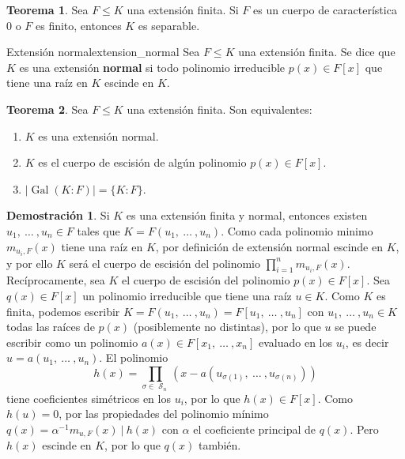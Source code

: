 \documentclass[a4paper]{book}
\theoremstyle{definition}
\newtheorem{theorem}{Teorema}[section]
\theoremstyle{ejemplo}
\theoremstyle{demostracion}
\newtheorem{dem}{Demostración}
\DeclareMathOperator{\simgroup}{\mathcal{S}}
\DeclareMathOperator{\grupogalois}{Gal}
\begin{document}
\begin{theorem}
	Sea $F \leq K$ una extensión finita. Si $F$ es un cuerpo de característica $0$ o $F$ es finito, entonces $K$ es separable.
\end{theorem}

\begin{define}{Extensión normal}{extension_normal}
	Sea $F \leq K$ una extensión finita. Se dice que $K$ es una extensión \textbf{normal} si todo polinomio irreducible $p(x) \in F[x]$ que tiene una raíz en $K$ escinde en $K$.
\end{define}

\begin{theorem}
	Sea $F \leq K$ una extensión finita. Son equivalentes:
	\begin{enumerate}
		\item
		$K$ es una extensión normal.
		\item
		$K$ es el cuerpo de escisión de algún polinomio $p(x) \in F[x]$.
		\item
		$|\grupogalois(K:F)| = \{K:F\}$.
	\end{enumerate}
\end{theorem}

\begin{dem}
	Si $K$ es una extensión finita y normal, entonces existen $u_1,\ \ldots\ ,u_n \in F$ tales que $K = F(u_1,\ \ldots\ ,u_n)$. Como cada polinomio minimo $m_{u_i,F}(x)$ tiene una raíz en $K$, por definición de extensión normal escinde en $K$, y por ello $K$ será el cuerpo de escisión del polinomio $\prod_{i=1}^{n} m_{u_i,F}(x)$.\\ 
	Recíprocamente, sea $K$ el cuerpo de escisión del polinomio $p(x) \in F[x]$. Sea $q(x) \in F[x]$ un polinomio irreducible que tiene una raíz $u \in K$. Como $K$ es finita, podemos escribir $K = F(u_1,\ \ldots\ ,u_n) = F[u_1,\ \ldots\ ,u_n]$ con $u_1,\ \ldots\ ,u_n \in K$ todas las raíces de $p(x)$ (posiblemente no distintas), por lo que $u$ se puede escribir como un polinomio $a(x) \in F[x_1,\ \ldots\ ,x_n]$ evaluado en los $u_i$, es decir $u = a(u_1,\ \ldots\ ,u_n)$. El polinomio
	\begin{equation*}
		h(x) = \prod_{\sigma \in \simgroup_n} (x - a(u_{\sigma(1)},\ \ldots\ ,u_{\sigma(n)}))
	\end{equation*}
	tiene coeficientes simétricos en los $u_i$, por lo que $h(x) \in F[x]$. Como $h(u) = 0$, por las propiedades del polinomio mínimo $q(x) = \alpha^{-1}m_{u,F}(x)\ |\ h(x)$ con $\alpha$ el coeficiente principal de $q(x)$. Pero $h(x)$ escinde en $K$, por lo que $q(x)$ también.
\end{dem}
\end{document}
